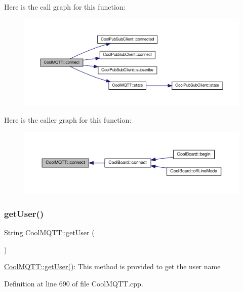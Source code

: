 Here is the call graph for this function\+:\nopagebreak
\begin{figure}[H]
\begin{center}
\leavevmode
\includegraphics[width=350pt]{d0/dd0/class_cool_m_q_t_t_a50075d0ab23a327ab897fd6adad20eda_cgraph}
\end{center}
\end{figure}
Here is the caller graph for this function\+:\nopagebreak
\begin{figure}[H]
\begin{center}
\leavevmode
\includegraphics[width=350pt]{d0/dd0/class_cool_m_q_t_t_a50075d0ab23a327ab897fd6adad20eda_icgraph}
\end{center}
\end{figure}
\mbox{\label{class_cool_m_q_t_t_a373cc92fca7760d886f02d8a6e5b3f63}} 
\subsubsection{\texorpdfstring{get\+User()}{getUser()}}
{\footnotesize\ttfamily String Cool\+M\+Q\+T\+T\+::get\+User (\begin{DoxyParamCaption}{ }\end{DoxyParamCaption})}

\hyperlink{class_cool_m_q_t_t_a373cc92fca7760d886f02d8a6e5b3f63}{Cool\+M\+Q\+T\+T\+::get\+User()}\+: This method is provided to get the user name 

Definition at line 690 of file Cool\+M\+Q\+T\+T.\+cpp.


